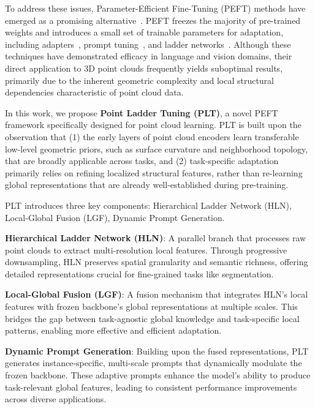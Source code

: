 To address these issues, Parameter-Efficient Fine-Tuning (PEFT) methods have emerged as a promising alternative~\cite{houlsby2019parameter, jie2023fact, karimi2021compacter}. PEFT freezes the majority of pre-trained weights and introduces a small set of trainable parameters for adaptation, including adapters~\cite{houlsby2019parameter}, prompt tuning~\cite{li2021prefix}, and ladder networks~\cite{sung2022lst}. Although these techniques have demonstrated efficacy in language and vision domains, their direct application to 3D point clouds frequently yields suboptimal results, primarily due to the inherent geometric complexity and local structural dependencies characteristic of point cloud data.



In this work, we propose \textbf{Point Ladder Tuning (PLT)}, a novel PEFT framework specifically designed for point cloud learning. PLT is built upon the observation that (1) the early layers of point cloud encoders learn transferable low-level geometric priors, such as surface curvature and neighborhood topology, that are broadly applicable across tasks, and (2) task-specific adaptation primarily relies on refining localized structural features, rather than re-learning global representations that are already well-established during pre-training.

PLT introduces three key components: Hierarchical Ladder Network (HLN), Local-Global Fusion (LGF), Dynamic Prompt Generation.

\textbf{Hierarchical Ladder Network (HLN)}: A parallel branch that processes raw point clouds to extract multi-resolution local features. Through progressive downsampling, HLN preserves spatial granularity and semantic richness, offering detailed representations crucial for fine-grained tasks like segmentation.

\textbf{Local-Global Fusion (LGF)}: A fusion mechanism that integrates HLN's local features with frozen backbone's global representations at multiple scales. This bridges the gap between task-agnostic global knowledge and task-specific local patterns, enabling more effective and efficient adaptation.

\textbf{Dynamic Prompt Generation}: Building upon the fused representations, PLT generates instance-specific, multi-scale prompts that dynamically modulate the frozen backbone. These adaptive prompts enhance the model's ability to produce task-relevant global features, leading to consistent performance improvements across diverse applications.


